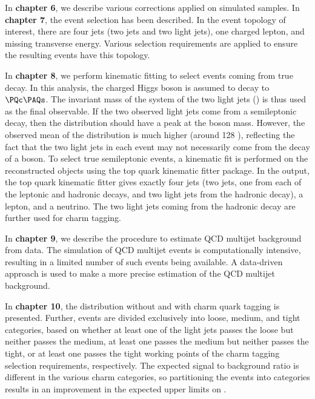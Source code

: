 In \textbf{chapter 6}, we describe various corrections applied on simulated samples.
In \textbf{chapter 7}, the event selection has been described. In the event 
topology of interest, there are four jets (two \PQb jets and two light jets), 
one charged lepton, and missing transverse energy. Various selection requirements are 
applied to ensure the resulting events have this topology. 

In \textbf{chapter 8}, we perform kinematic fitting to select events coming from
true \ttbar decay. In this analysis, the charged Higgs boson is assumed to decay 
to $\PQc\PAQs$. The invariant mass of the system of the two light jets (\mjj) is 
thus used as the final observable. If the two observed light jets come from a 
semileptonic \ttbar decay, then the \mjj distribution should have a peak at the 
\PW boson mass. However, the observed mean of the \mjj distribution is much higher 
(around 128 \GeV), reflecting the fact that the two light jets in each event may 
not necessarily come from the decay of a \PW boson. To select true semileptonic
\ttbar events, a kinematic fit is performed on the reconstructed objects using 
the top quark kinematic fitter package. In the output, the top quark  
kinematic fitter gives exactly four jets (two \PQb jets, one from each of the 
leptonic and hadronic \PQt decays, and two light jets from the hadronic \PQt 
decay), a lepton, and a neutrino. The two light jets coming from the hadronic 
\PQt decay are further used for charm tagging. 

In \textbf{chapter 9}, we describe the procedure to estimate QCD multijet background from data.
The simulation of QCD multijet events is computationally intensive, resulting in a 
limited number of such events being available. A data-driven approach is used 
to make a more precise estimation of the QCD multijet background.

In \textbf{chapter 10}, the \mjj distribution without and with charm quark tagging 
is presented. Further, events are divided exclusively into loose, medium, and tight 
categories, based on whether at least one of the light jets passes the loose 
but neither passes the medium, at least one passes the medium but neither passes 
the tight, or at least one passes the tight working points of the charm tagging 
selection requirements, respectively. The expected signal to background ratio 
is different in the various charm categories, so partitioning the events into 
categories results in an improvement in the expected upper limits on \brThb. 

